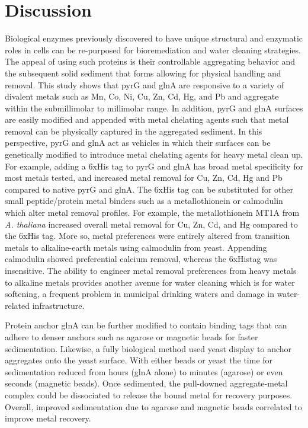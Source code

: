 \documentclass[../main/main]{subfiles}
\begin{document}
\section{Discussion}
Biological enzymes previously discovered to have unique structural and enzymatic roles in cells can be re-purposed for bioremediation and water cleaning strategies. The appeal of using such proteins is their controllable aggregating behavior and the subsequent solid sediment that forms allowing for physical handling and removal. This study shows that pyrG and glnA are responsive to a variety of divalent metals such as Mn, Co, Ni, Cu, Zn, Cd, Hg, and Pb and aggregate within the submillimolar to millimolar range. In addition, pyrG and glnA surfaces are easily modified and appended with metal chelating agents such that metal removal can be physically captured in the aggregated sediment. In this perspective, pyrG and glnA act as vehicles in which their surfaces can be genetically modified to introduce metal chelating agents for heavy metal clean up. For example, adding a 6xHis tag to pyrG and glnA has broad metal specificity for most metals tested, and increased metal removal for Cu, Zn, Cd, Hg and Pb compared to native pyrG and glnA. The 6xHis tag can be substituted for other small peptide/protein metal binders such as a metallothionein or calmodulin which alter metal removal profiles. For example, the metallothionein MT1A from \textit{A. thaliana} increased overall metal removal for Cu, Zn, Cd, and Hg compared to the 6xHis tag. More so, metal preferences were entirely altered from transition metals to alkaline-earth metals using calmodulin from yeast. Appending calmodulin showed preferential calcium removal, whereas the 6xHistag was insensitive. The ability to engineer metal removal preferences from heavy metals to alkaline metals provides another avenue for water cleaning which is for water softening, a frequent problem in municipal drinking waters and damage in water-related infrastructure.

Protein anchor glnA can be further modified to contain binding tags that can adhere to denser anchors such as agarose or magnetic beads for faster sedimentation. Likewise, a fully biological method used yeast display to anchor aggregates onto the yeast surface. With either beads or yeast the time for sedimentation reduced from hours (glnA alone) to minutes (agarose) or even seconds (magnetic beads). Once sedimented, the pull-downed aggregate-metal complex could be dissociated to release the bound metal for recovery purposes. Overall, improved sedimentation due to agarose and magnetic beads correlated to improve metal recovery.
\end{document}
